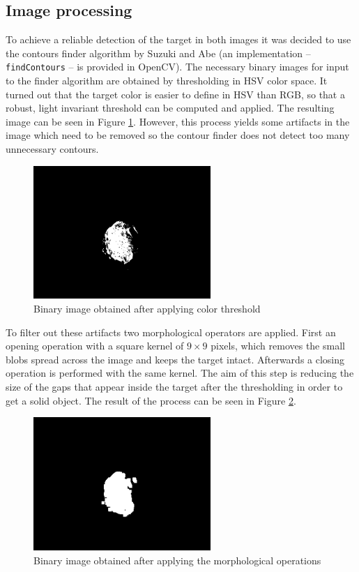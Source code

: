 \subsection{Image processing}
To achieve a reliable detection of the target in both images it was decided to use the contours finder algorithm by Suzuki and Abe \cite{suzuki} (an implementation -- \texttt{findContours} -- is provided in OpenCV).
The necessary binary images for input to the finder algorithm are obtained by thresholding in HSV color space.
It turned out that the target color is easier to define in HSV than RGB, so that a robust, light invariant threshold can be computed and applied. The resulting image can be seen in Figure \ref{fig:binary_image}.
However, this process yields some artifacts in the image which need to be removed so the contour finder does not detect too many unnecessary contours.

\begin{figure}[htb]
    \centering
    \includegraphics[width=0.6\textwidth]{figures/binary.png}
    \caption{Binary image obtained after applying color threshold}
    \label{fig:binary_image}
\end{figure}

To filter out these artifacts two morphological operators are applied.
First an opening operation with a square kernel of $9 \times 9$ pixels, which removes the small blobs spread across the image and keeps the target intact.
Afterwards a closing operation is performed with the same kernel.
The aim of this step is reducing the size of the gaps that appear inside the target after the thresholding in order to get a solid object.
The result of the process can be seen in Figure \ref{fig:filtered_image}.

\begin{figure}[htb]
    \centering
    \includegraphics[width=0.6\textwidth]{figures/filtered.png}
    \caption{Binary image obtained after applying the morphological operations}
    \label{fig:filtered_image}
\end{figure}

